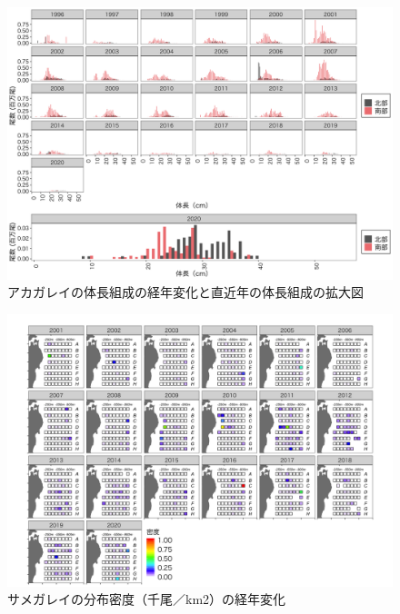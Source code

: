 \documentclass[11pt]{article} %
\begin{document}
\begin{linenumbers}
\begin{figure}[h]
  \centering
  \includegraphics[width = 14cm]{アカガレイlength.png}
  \caption{アカガレイの体長組成の経年変化と直近年の体長組成の拡大図}
\end{figure}

\begin{figure}[h]
  \centering
  \includegraphics[width = 14cm]{サメガレイdens.png}
  \caption{サメガレイの分布密度（千尾／km2）の経年変化}
\end{figure}


\end{linenumbers}
\end{document}

